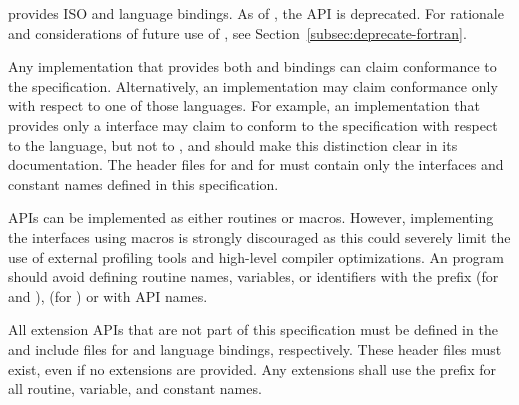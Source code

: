 \openshmem provides ISO \Cstd and \Fortran[90] language bindings.
As of \openshmem[1.4], the \Fortran API is deprecated.
For rationale and considerations of
future \Fortran use of \openshmem, see Section~\ref{subsec:deprecate-fortran}.

Any implementation that provides both \Cstd and \Fortran bindings can claim
conformance to the specification. Alternatively, an implementation may claim
conformance only with respect to one of those languages. For example,
an implementation that provides only a
\Cstd interface may claim to conform to the \openshmem specification with
respect to the \Cstd language, but not to \Fortran, and should make this distinction
clear in its documentation. The \openshmem header files  for
\Cstd and  for
\Fortran must contain only the interfaces and constant names defined in this
specification.

\openshmem \acp{API} can be implemented as either routines or macros. However,
implementing the interfaces using macros is strongly discouraged as this could
severely limit the use of external profiling tools and high-level compiler
optimizations. An \openshmem program should avoid defining routine names,
variables, or identifiers with the prefix \shmemprefix (for \Cstd and
\Fortran), \shmemprefixC (for \Cstd) or with \openshmem \ac{API} names.

All \openshmem extension \acp{API} that are not part of this specification must
be defined in the  and  include files for
\Cstd and \Fortran language bindings, respectively.  These header files
must exist, even if no extensions are provided.  Any extensions shall use the
 prefix for all routine, variable, and constant names.
